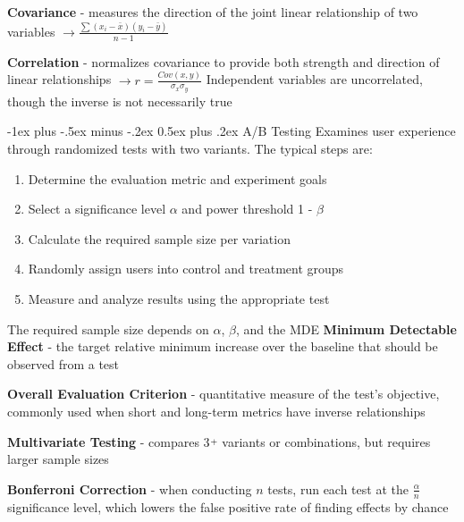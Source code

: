 \documentclass[10pt,landscape]{article}
\makeatletter
\newcommand{\plus}{\raisebox{.3\height}{\scalebox{.7}{+}}}
\renewcommand{\section}{\@startsection{section}{1}{0mm}%
                                {-1ex plus -.5ex minus -.2ex}%
                                {0.5ex plus .2ex}%
                                {\normalfont\large\bfseries}}
\makeatother
\begin{document}
\begin{multicols}{3}
        \textbf{Covariance} - measures the direction of the joint linear relationship of two variables
    $\to \frac{\sum (x_i - \bar{x}) (y_i - \bar{y})}{n-1} $

        \textbf{Correlation} - normalizes covariance to provide both strength and direction of linear relationships $\to r =  \frac{Cov(x,y)}{\sigma_x \sigma_y}$
        Independent variables are uncorrelated,  though the inverse is not necessarily true

        \newcommand*{\Perm}[2]{{}^{#1}\!P_{#2}}%
        \newcommand*{\Comb}[2]{{}^{#1}C_{#2}}%
        \smallskip

        \section{A/B Testing}
        Examines user experience through randomized tests with two variants.
        The typical steps are:
        \begin{enumerate}[leftmargin=5mm]
            \itemsep -.4mm
            \item Determine the evaluation metric and experiment goals
            \item Select a significance level $\alpha$ and power threshold 1 - $\beta$
            \item Calculate the required sample size per variation
            \item Randomly assign users into control and treatment groups
            \item Measure and analyze results using the appropriate test
        \end{enumerate}

        The required sample size depends on $\alpha$, $\beta$, and the MDE
        \textbf{Minimum Detectable Effect} - the target relative minimum increase over the baseline that should be observed from a test
        \vspace{.5mm}

        \textbf{Overall Evaluation Criterion} - quantitative measure of the test's objective, commonly used when short and long-term metrics have inverse relationships
        \vspace{.7mm}

        \textbf{Multivariate Testing} - compares 3$\plus$ variants or combinations, but requires larger sample sizes

        \textbf{Bonferroni Correction} - when conducting $n$ tests,
        run each test at the $\frac{\alpha}{n}$ significance level, which lowers the false positive rate of finding effects by chance
        \vspace{.7mm}


\end{multicols}
\end{document}
